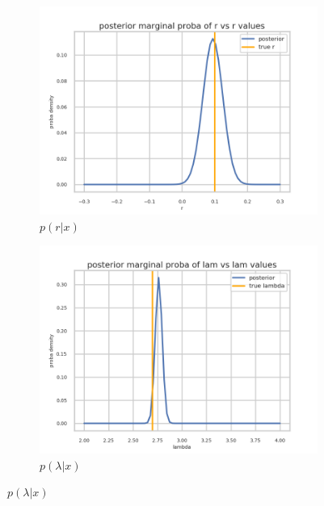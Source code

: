 \begin{figure}[htb]
  \centering
  \begin{subfigure}[t]{0.49\linewidth}
    \includegraphics[width=\linewidth]{s3d2/marginal_r.png}
    \caption{$p(r|x)$}
    \label{fig:marginal_r}
  \end{subfigure}%
  \hfill
  \begin{subfigure}[t]{0.49\linewidth}
    \includegraphics[width=\linewidth]{s3d2/marginal_lam.png}
    \caption{$p(\lambda|x)$}
    \label{fig:marginal_lambda}
  \end{subfigure}


\end{figure}
